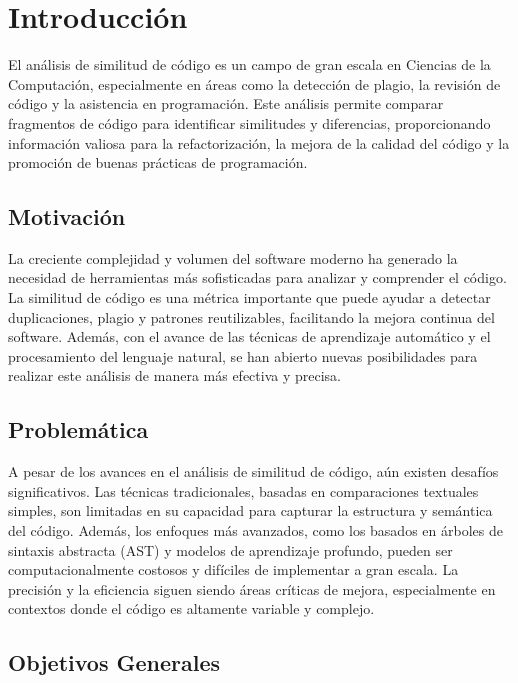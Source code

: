\chapter*{Introducción}\label{chapter:introduction}

El análisis de similitud de código es un campo de gran escala en Ciencias de la Computación, especialmente en áreas como la detección de plagio, la revisión de código y la asistencia en programación. Este análisis permite comparar fragmentos de código para identificar similitudes y diferencias, proporcionando información valiosa para la refactorización, la mejora de la calidad del código y la promoción de buenas prácticas de programación. \\

\section{Motivación}
La creciente complejidad y volumen del software moderno ha generado la necesidad de herramientas más sofisticadas para analizar y comprender el código. La similitud de código es una métrica importante que puede ayudar a detectar duplicaciones, plagio y patrones reutilizables, facilitando la mejora continua del software. Además, con el avance de las técnicas de aprendizaje automático y el procesamiento del lenguaje natural, se han abierto nuevas posibilidades para realizar este análisis de manera más efectiva y precisa.

\section{Problemática}
A pesar de los avances en el análisis de similitud de código, aún existen desafíos significativos. Las técnicas tradicionales, basadas en comparaciones textuales simples, son limitadas en su capacidad para capturar la estructura y semántica del código. Además, los enfoques más avanzados, como los basados en árboles de sintaxis abstracta (AST) y modelos de aprendizaje profundo, pueden ser computacionalmente costosos y difíciles de implementar a gran escala. La precisión y la eficiencia siguen siendo áreas críticas de mejora, especialmente en contextos donde el código es altamente variable y complejo.

\section{Objetivos Generales} 

